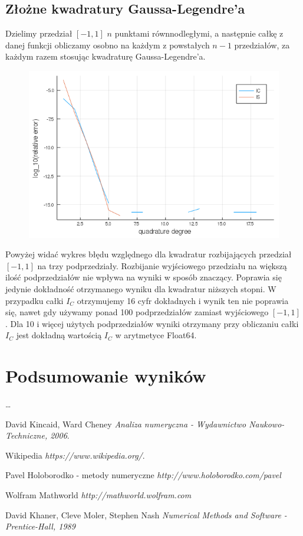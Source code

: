 \documentclass{article}
\begin{document}
\subsection*{Złożne kwadratury Gaussa-Legendre'a}
	Dzielimy przedział $[-1,1]$ $n$ punktami równnodległymi, a następnie całkę z danej funkcji obliczamy osobno na każdym z powstałych $n-1$ przedziałów, za każdym razem stosując kwadraturę Gaussa-Legendre'a. 

\begin{figure}[ht]
    \includegraphics[scale=0.5]{WykresD2logrelative.png}
    \label{WykresD2}
\end{figure}
Powyżej widać wykres błędu względnego dla kwadratur rozbijających przedział $[-1,1]$ na trzy podprzedziały. Rozbijanie wyjściowego przedziału na większą ilość podprzedziałów nie wpływa na wyniki w sposób znaczący. Poprawia się jedynie dokładność otrzymanego wyniku dla kwadratur niższych stopni. W przypadku całki $I_C$ otrzymujemy 16 cyfr dokładnych i wynik ten nie poprawia się, nawet gdy używamy ponad 100 podprzedziałów zamiast wyjściowego $[-1,1]$. Dla 10 i więcej użytych podprzedziałów wyniki otrzymany przy obliczaniu całki $I_C$ jest dokładną wartością $I_C$ w arytmetyce Float64.  

\section*{Podsumowanie wyników}
\dots
\begin{thebibliography}{9}

  
  David Kincaid, Ward Cheney
  \emph{Analiza numeryczna - Wydawnictwo Naukowo-Techniczne, 2006}.

  Wikipedia
  \emph{https://www.wikipedia.org/}.

	Pavel Holoborodko - metody numeryczne
		\emph{http://www.holoborodko.com/pavel}

	Wolfram Mathworld
		\emph{http://mathworld.wolfram.com}

	David Khaner, Cleve Moler, Stephen Nash
	\emph{Numerical Methods and Software - Prentice-Hall, 1989}
\end{thebibliography}
\end{document}
